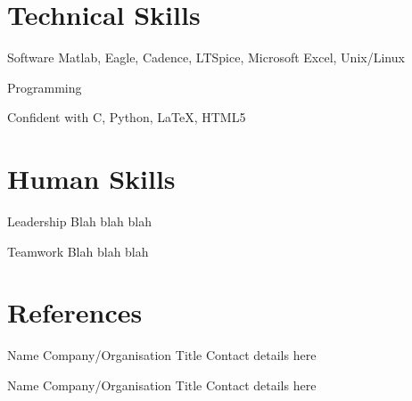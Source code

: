 \documentclass[]{friggeri-cv} %
\begin{document}

\section{Technical Skills}

\begin{entrylist}




\entry
{}
{Software}
{}
{}
{
Matlab, Eagle, Cadence, LTSpice, Microsoft Excel, Unix/Linux
}



\entry
{}
{Programming}
{}
{}
{
Confident with C, Python, \LaTeX, HTML5

}




\end{entrylist}




\section{Human Skills}

\begin{entrylist}




\entry
{}
{Leadership}
{}
{}
{
Blah blah blah
}



\entry
{}
{Teamwork}
{}
{}
{
Blah blah blah
}




\end{entrylist}



\section{References}


\begin{entrylist}


\entry
{}
{Name}
{Company/Organisation}
{Title}
{
Contact details here
}


\entry
{}
{Name}
{Company/Organisation}
{Title}
{
Contact details here
}

\end{entrylist} 

\end{document}
